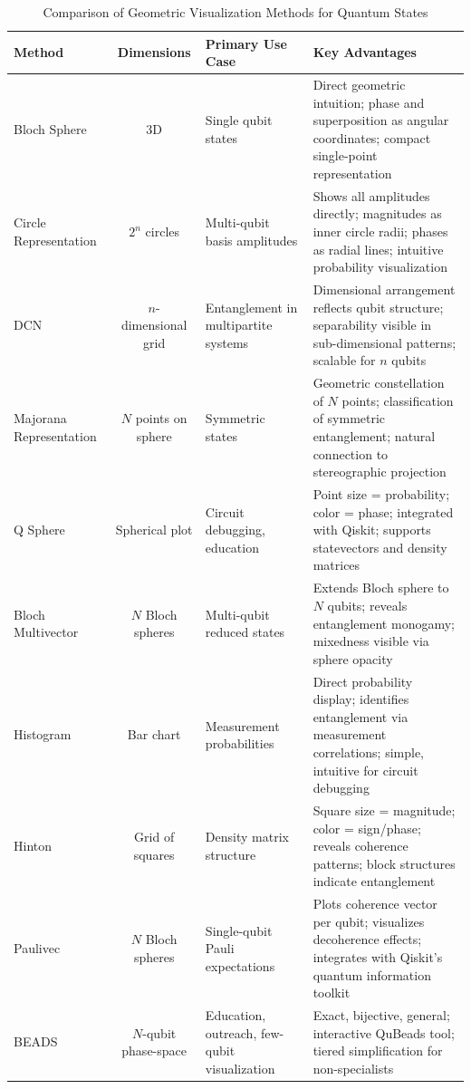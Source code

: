 \documentclass[%
 amsmath,amssymb,
 aps,
rmp,
]{revtex4-2}
\begin{document}
\begin{table}[htbp]
	\centering
	\caption{Comparison of Geometric Visualization Methods for Quantum States}
	\label{tab:geometric-comparison}
	\begin{tabular}{|l|c|p{3.2cm}|p{4.5cm}|}
		\hline
		\textbf{Method} & \textbf{Dimensions} & \textbf{Primary Use Case} & \textbf{Key Advantages} \\
		\hline
		Bloch Sphere & 3D & Single qubit states & Direct geometric intuition; phase and superposition as angular coordinates; compact single-point representation \\
		\hline
		Circle Representation & $2^n$ circles & Multi-qubit basis amplitudes & Shows all amplitudes directly; magnitudes as inner circle radii; phases as radial lines; intuitive probability visualization \\
		\hline
		DCN & $n$-dimensional grid & Entanglement in multipartite systems & Dimensional arrangement reflects qubit structure; separability visible in sub-dimensional patterns; scalable for $n$ qubits \\
		\hline
		Majorana Representation & $N$ points on sphere & Symmetric states & Geometric constellation of $N$ points; classification of symmetric entanglement; natural connection to stereographic projection \\
		\hline
		Q Sphere & Spherical plot & Circuit debugging, education & Point size = probability; color = phase; integrated with Qiskit; supports statevectors and density matrices \\
		\hline
		Bloch Multivector & $N$ Bloch spheres & Multi-qubit reduced states & Extends Bloch sphere to $N$ qubits; reveals entanglement monogamy; mixedness visible via sphere opacity \\
		\hline
		Histogram & Bar chart & Measurement probabilities & Direct probability display; identifies entanglement via measurement correlations; simple, intuitive for circuit debugging \\
		\hline
		Hinton & Grid of squares & Density matrix structure & Square size = magnitude; color = sign/phase; reveals coherence patterns; block structures indicate entanglement \\
		\hline
		Paulivec & $N$ Bloch spheres & Single-qubit Pauli expectations & Plots coherence vector per qubit; visualizes decoherence effects; integrates with Qiskit's quantum information toolkit \\
		\hline
		BEADS & $N$-qubit phase-space & Education, outreach, few-qubit visualization & Exact, bijective, general; interactive QuBeads tool; tiered simplification for non-specialists \\
		\hline
	\end{tabular}
\end{table}
\end{document}
